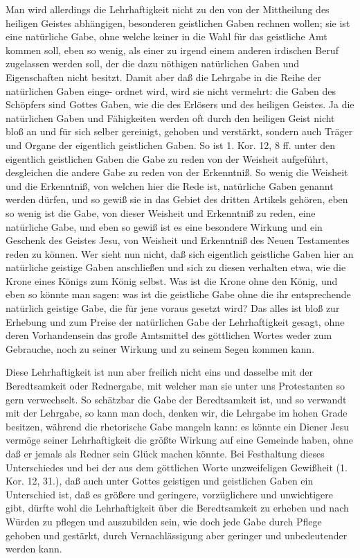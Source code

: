 Man wird allerdings die Lehrhaftigkeit nicht zu den von der Mittheilung des heiligen Geistes abhängigen, besonderen geistlichen Gaben rechnen wollen; sie ist eine natürliche Gabe, ohne welche keiner in die Wahl für das geistliche Amt kommen soll, eben so wenig, als einer zu irgend einem anderen irdischen Beruf zugelassen werden soll, der die dazu nöthigen natürlichen Gaben und Eigenschaften nicht besitzt. Damit aber daß die Lehrgabe in die Reihe der natürlichen Gaben einge-
ordnet wird, wird sie nicht vermehrt: die Gaben des Schöpfers sind Gottes Gaben, wie die des Erlösers und des heiligen Geistes. Ja die natürlichen Gaben und Fähigkeiten werden oft durch den heiligen Geist nicht bloß an und für sich selber gereinigt, gehoben und verstärkt, sondern auch Träger und Organe der eigentlich geistlichen Gaben. So ist 1. Kor. 12, 8 ff. unter den eigentlich geistlichen Gaben die Gabe zu reden von der Weisheit aufgeführt, desgleichen die andere Gabe zu reden von der Erkenntniß. So wenig die Weisheit und die Erkenntniß, von welchen hier die Rede ist, natürliche Gaben genannt werden dürfen, und so gewiß sie in das Gebiet des dritten Artikels gehören, eben so wenig ist die Gabe, von dieser Weisheit und Erkenntniß zu reden, eine natürliche Gabe, und eben so gewiß ist es eine besondere Wirkung und ein Geschenk des Geistes Jesu, von Weisheit und Erkenntniß des Neuen Testamentes reden zu können. Wer sieht nun nicht, daß sich eigentlich geistliche Gaben hier an natürliche geistige Gaben anschließen und sich zu diesen verhalten etwa, wie die Krone eines Königs zum König selbst. Was ist die Krone ohne den König, und eben so könnte man sagen: was ist die geistliche Gabe ohne die ihr entsprechende natürlich geistige Gabe, die für jene voraus gesetzt wird? Das alles ist bloß zur Erhebung und zum Preise der natürlichen Gabe der Lehrhaftigkeit gesagt, ohne deren Vorhandensein das große Amtsmittel des göttlichen Wortes weder zum Gebrauche, noch zu seiner Wirkung und zu seinem Segen kommen kann.

Diese Lehrhaftigkeit ist nun aber freilich nicht eins und
dasselbe mit der Beredtsamkeit oder Rednergabe, mit welcher man sie unter uns Protestanten so gern verwechselt. So schätzbar die Gabe der Beredtsamkeit ist, und so verwandt mit der Lehrgabe, so kann man doch, denken wir, die Lehrgabe im hohen Grade besitzen, während die rhetorische Gabe mangeln kann: es könnte ein Diener Jesu vermöge seiner Lehrhaftigkeit die größte Wirkung auf eine Gemeinde haben, ohne daß er jemals als Redner sein Glück machen könnte. Bei Festhaltung dieses Unterschiedes und bei der aus dem göttlichen Worte unzweifeligen Gewißheit (1. Kor. 12, 31.), daß auch unter Gottes geistigen und geistlichen Gaben ein Unterschied ist, daß es größere und geringere, vorzüglichere und unwichtigere gibt, dürfte wohl die Lehrhaftigkeit über die Beredtsamkeit zu erheben und nach Würden zu pflegen und auszubilden sein, wie doch jede Gabe durch Pflege gehoben und gestärkt, durch Vernachlässigung aber geringer und unbedeutender werden kann.

